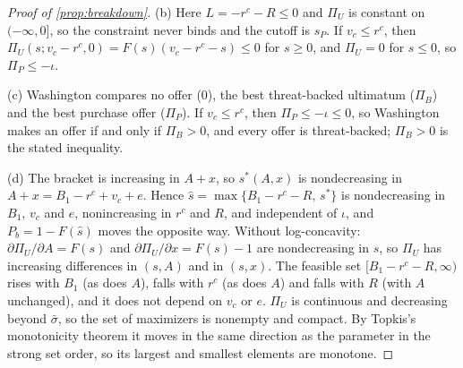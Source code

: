 \begin{proof}[Proof of \cref{prop:breakdown}]
(b) Here $L=-r^c-R\le 0$ and $\Pi_U$ is constant on $(-\infty,0]$, so the constraint never binds and the cutoff is $s_P$. If $v_c\le r^c$, then $\Pi_U(s;v_c-r^c,0)=F(s)(v_c-r^c-s)\le 0$ for $s\ge 0$, and $\Pi_U=0$ for $s\le 0$, so $\Pi_P\le-\iota$.

(c) Washington compares no offer ($0$), the best threat-backed ultimatum ($\Pi_B$) and the best purchase offer ($\Pi_P$). If $v_c\le r^c$, then $\Pi_P\le-\iota\le 0$, so Washington makes an offer if and only if $\Pi_B>0$, and every offer is threat-backed; $\Pi_B>0$ is the stated inequality.

(d) The bracket is increasing in $A+x$, so $s^*(A,x)$ is nondecreasing in $A+x=B_1-r^c+v_c+e$. Hence $\hat s=\max\{B_1-r^c-R,\,s^*\}$ is nondecreasing in $B_1$, $v_c$ and $e$, nonincreasing in $r^c$ and $R$, and independent of $\iota$, and $P_b=1-F(\hat s)$ moves the opposite way. Without log-concavity: $\partial\Pi_U/\partial A=F(s)$ and $\partial\Pi_U/\partial x=F(s)-1$ are nondecreasing in $s$, so $\Pi_U$ has increasing differences in $(s,A)$ and in $(s,x)$. The feasible set $[B_1-r^c-R,\infty)$ rises with $B_1$ (as does $A$), falls with $r^c$ (as does $A$) and falls with $R$ (with $A$ unchanged), and it does not depend on $v_c$ or $e$. $\Pi_U$ is continuous and decreasing beyond $\bar\sigma$, so the set of maximizers is nonempty and compact. By Topkis's monotonicity theorem it moves in the same direction as the parameter in the strong set order, so its largest and smallest elements are monotone.


\end{proof}
